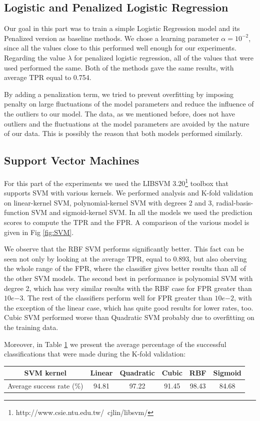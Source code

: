 \subsection{Logistic and Penalized Logistic Regression}
\noindent Our goal in this part was to train a simple Logistic Regression model and its Penalized version as baseline methods. We chose a learning parameter $\alpha = 10^{-2}$, since all the values close to this performed well enough for our experiments. Regarding the value  $\lambda$ for penalized logistic regression, all of the values that were used performed the same.  Both of the methods gave the same results, with average TPR equal to 0.754.

 By adding a penalization term, we tried to prevent overfitting by imposing penalty on large fluctuations of the model parameters and reduce the influence of the outliers to our model. The data, as we mentioned before, does not have outliers and the fluctuations at the model parameters are avoided by the nature of our data. This is possibly the reason that both models performed similarly. 
\subsection{Support Vector Machines}
\noindent For this part of the experiments we used the LIBSVM 3.20\footnote{http://www.csie.ntu.edu.tw/~cjlin/libsvm/} toolbox that supports SVM with various kernels.  We performed analysis and K-fold validation on linear-kernel SVM, polynomial-kernel SVM with degrees 2 and 3, radial-basis-function SVM and sigmoid-kernel SVM. In all the models we used the prediction scores to compute the TPR and the FPR. A comparison of the various model is given in Fig \ref{fig:SVM}.

We observe that the RBF SVM performs significantly better. This fact can be seen not only by looking at the average TPR, equal to 0.893, but also oberving the whole range of the FPR, where the classifier gives better results than all of the other SVM models. The second best in performance is polynomial SVM with degree 2, which has very similar results with the RBF case for FPR greater than $10e{-3}$. The rest of the classifiers perform well for FPR greater than $10e{-2}$, with the exception of the linear case, which has quite good results for lower rates, too.  Cubic SVM performed worse than Quadratic SVM probably due to overfitting on the training data.

\noindent Moreover, in Table \ref{table:SVM_success} we present the average percentage of the successful classifications that were made during the K-fold validation:
\begin{table}[h]
  \centering
  \begin{tabular}{ | c | c | c | c | c | c |}
  \hline
  SVM kernel & Linear & Quadratic & Cubic & RBF & Sigmoid \\ \hline
  Average success rate (\%) & 94.81 & 97.22 & 91.45 & 98.43 & 84.68 \\ \hline
  \end{tabular}
  \label{table:SVM_success}
\end{table}
